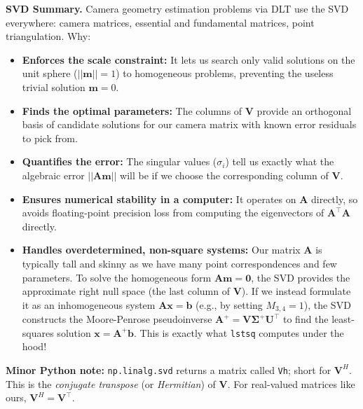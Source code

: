 \documentclass{csci1430}
\begin{document}
\pagebreak

\textbf{SVD Summary.} Camera geometry estimation problems via DLT use the SVD everywhere: camera matrices, essential and fundamental matrices, point triangulation. Why:
\begin{itemize}[leftmargin=12pt]
    \item \textbf{Enforces the scale constraint:} It lets us search only valid solutions on the unit sphere ($||\mathbf{m}||=1$) to homogeneous problems, preventing the useless trivial solution $\mathbf{m}=0$.
    \item \textbf{Finds the optimal parameters:} The columns of $\mathbf{V}$ provide an orthogonal basis of candidate solutions for our camera matrix with known error residuals to pick from.
    \item \textbf{Quantifies the error:} The singular values ($\sigma_i$) tell us exactly what the algebraic error $||\mathbf{A}\mathbf{m}||$ will be if we choose the corresponding column of $\mathbf{V}$.
    \item \textbf{Ensures numerical stability in a computer:} It operates on $\mathbf{A}$ directly, so avoids floating-point precision loss from computing the eigenvectors of $\mathbf{A}^\top\mathbf{A}$ directly.
    \item \textbf{Handles overdetermined, non-square systems:} Our matrix $\mathbf{A}$ is typically tall and skinny as we have many point correspondences and few parameters. To solve the homogeneous form $\mathbf{A}\mathbf{m} = \mathbf{0}$, the SVD provides the approximate right null space (the last column of $\mathbf{V}$). If we instead formulate it as an inhomogeneous system $\mathbf{A}\mathbf{x} = \mathbf{b}$ (e.g., by setting $M_{3,4} = 1$), the SVD constructs the Moore-Penrose pseudoinverse $\mathbf{A}^+ = \mathbf{V}\boldsymbol{\Sigma}^+\mathbf{U}^\top$ to find the least-squares solution $\mathbf{x} = \mathbf{A}^+\mathbf{b}$. This is exactly what \texttt{lstsq} computes under the hood!
\end{itemize}

\vspace{1cm}
\textbf{Minor Python note:} \texttt{np.linalg.svd} returns a matrix called \texttt{Vh}; short for $\mathbf{V}^H$. This is the \emph{conjugate transpose} (or \emph{Hermitian}) of $\mathbf{V}$. For real-valued matrices like ours, $\mathbf{V}^H = \mathbf{V}^\top$.

\pagebreak
\end{document}
